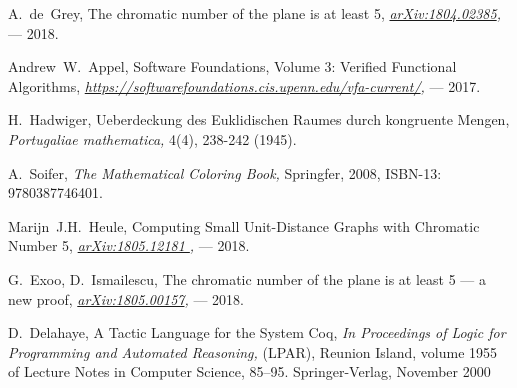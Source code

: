 \begin{thebibliography}{0}
    
    A.~de~Grey, 
    The chromatic number of the plane is at least 5, 
    {\it \href{arXiv:1804.02385}{arXiv:1804.02385}, }
    --- 2018. 
    
    Andrew~W.~Appel, 
    Software Foundations, Volume 3: Verified Functional Algorithms, 
    {\it \href{https://softwarefoundations.cis.upenn.edu/vfa-current/}{https://softwarefoundations.cis.upenn.edu/vfa-current/}, }
    --- 2017. 


    H.~Hadwiger,
    Ueberdeckung des Euklidischen Raumes durch kongruente Mengen,
    {\it Portugaliae mathematica,}
    4(4), 238-242 (1945).
    
    A.~Soifer,
    {\it The Mathematical Coloring Book,}
    Springfer, 2008, ISBN-13: 9780387746401.

    Marijn~J.H.~Heule,
    Computing Small Unit-Distance Graphs with Chromatic Number 5,
    {\it \href{ arXiv:1805.12181}{ arXiv:1805.12181 },} 
    --- 2018.
    
    G.~Exoo, D.~Ismailescu,
    The chromatic number of the plane is at least 5 --- a new proof,
    {\it \href{ arXiv:1805.00157}{ arXiv:1805.00157}, }
    --- 2018.
    
    D.~Delahaye,
    A Tactic Language for the System Coq,
    {\it In Proceedings of Logic for Programming and Automated Reasoning,}
    (LPAR), Reunion Island, volume 1955 of Lecture Notes in Computer Science, 85–95. Springer-Verlag, 
    November 2000
    
    

\end{thebibliography}